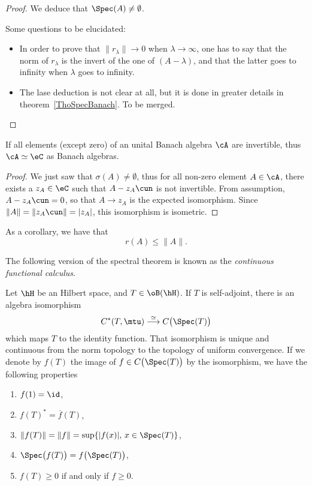 \begin{proof}
	We deduce that $\Spec(A)\neq\emptyset$.

	\begin{probleme}
		Some questions to be elucidated:
	\begin{itemize}
	\item In order to prove that $\| r_{\lambda} \|\to 0$ when $\lambda\to\infty$, one has to say that the norm of $r_{\lambda}$ is the invert of the one of $(A-\lambda)$,  and that the latter goes to infinity when $\lambda$ goes to infinity.
	\item The lase deduction is not clear at all, but it is done in greater details in theorem~\ref{ThoSpecBanach}. To be merged.
	\end{itemize}

	\end{probleme}
\end{proof}



\begin{corollary}
If all elements (except zero) of an unital Banach algebra $\cA$ are invertible, thus $\cA\simeq\eC$ as Banach algebras.
\label{cor:GelfandMazur}
\end{corollary}

\begin{proof}
	We just saw that $\sigma(A)\neq\emptyset$, thus for all non-zero element $A\in\cA$, there exists a $z_A\in\eC$ such that $A-z_A\cun$ is not invertible. From assumption, $A-z_A\cun=0$, so that $A\to z_A$ is the expected isomorphism. Since $\|A\|=\|z_A\cun\|=|z_A|$, this isomorphism is isometric.
\end{proof}

As a corollary, we have that
\begin{equation}
r(A)\leq\|A\|.
\end{equation}

The following version of the spectral theorem is known as the \emph{continuous functional calculus}.
\begin{theorem}			\label{ThoSpectralTho}
Let $\hH$ be an Hilbert space, and $T\in\oB(\hH)$. If $T$ is self-adjoint, there is an algebra isomorphism
\[
  C^*(T,\mtu)\stackrel{\simeq}{\longrightarrow}C\big( \Spec(T) \big)
\]
which maps $T$ to the identity function. That isomorphism is unique and continuous from the norm topology to the topology of uniform convergence. If we denote by $f(T)$ the image of $f\in C\big( \Spec(T) \big)$ by the isomorphism, we have the following properties
\begin{enumerate}
\item $f(1)=\id$,
\item $f(T)^*=\overline{ f }(T)$,
\item $\| f(T) \|=\| f \|=\sup\{ | f(x) |,\,x\in\Spec(T) \}$,
\item\label{ItemSpecffSpecThoSpectral} $\Spec\big( f(T) \big)=f\big( \Spec(T) \big)$,
\item $f(T)\geq 0$ if and only if $f\geq 0$.
\end{enumerate}
\end{theorem}

